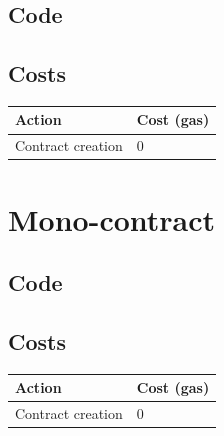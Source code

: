 \documentclass{article}
\begin{document}
		\subsection{Code}

			

		\subsection{Costs}

			\begin{tabular}{| l | l |}
				\hline
				Action & Cost (gas) \\ \hline
				Contract creation & 0 \\
				\hline
			\end{tabular}

	\section{Mono-contract}

		\subsection{Code}

			

		\subsection{Costs}

			\begin{tabular}{| l | l |}
				\hline
				Action & Cost (gas) \\ \hline
				Contract creation & 0 \\
				\hline
			\end{tabular}
\end{document}
